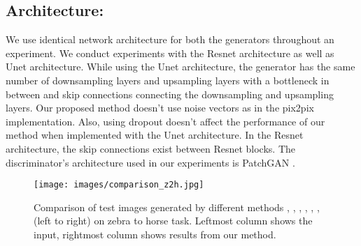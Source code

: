 \documentclass[a4paper,twoside]{article}
\begin{document}
\subsection{Architecture:}
\label{Architecture}
\noindent
We use identical network architecture for both the generators throughout an experiment. We conduct experiments with the Resnet \cite{Zhang2015Resnet} architecture as well as Unet \cite{Unet_RonnebergerFB15} architecture. While using the Unet architecture, the generator has the same number of downsampling layers and upsampling layers with a bottleneck in between and skip connections connecting the downsampling and upsampling layers. Our proposed method doesn't use noise vectors as in the pix2pix implementation\cite{pix2pix_isola2017}. Also, using dropout doesn't affect the performance of our method when implemented with the Unet architecture. In the Resnet architecture, the skip connections exist between Resnet blocks. The discriminator's architecture used in our experiments is PatchGAN \cite{CycleGAN2017}. 
\begin{table}[!ht] \footnotesize
\centering
\caption{Effect of network architectures \cite{Unet_RonnebergerFB15} and \cite{Zhang2015Resnet} on translation tasks horse  zebra and apples  oranges. The results are compared using FID and KID scores.}
\label{tab: Comparison of Network Architectures}
\end{table}
\begin{figure}[!ht] \small
\centering
\texttt{[image: images/comparison\_z2h.jpg]}
\caption{Comparison of test images generated by different methods \cite{CycleGAN2017}, \cite{Residual-Attention_WangJQYLZWT17}, \cite{DiscoGAN_KimCKLK17}, \cite{UNIT_LiuBK17}, \cite{DualGAN_YiZTG17}, \cite{Mejjati2018UAIT}, \cite{attentionGAN} (left to right) on zebra to horse task. Leftmost column shows the input, rightmost column shows results from our method.
}
\label{img:Comparison zebra to horse}
\end{figure}
\end{document}
